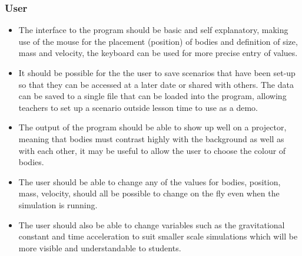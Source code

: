 \subsubsection{User}
\begin{itemize}
\item The interface to the program should be basic and self explanatory, making use of the mouse for the placement (position) of bodies and definition of size, mass and velocity, the keyboard can be used for more precise entry of values.
\item It should be possible for the the user to save scenarios that have been set-up so that they can be accessed at a later date or shared with others. The data can be saved to a single file that can be loaded into the program, allowing teachers to set up a scenario outside lesson time to use as a demo.
\item The output of the program should be able to show up well on a projector, meaning that bodies must contrast highly with the background as well as with each other, it may be useful to allow the user to choose the colour of bodies.
\item The user should be able to change any of the values for bodies, position, mass, velocity, should all be possible to change on the fly even when the simulation is running.
\item The user should also be able to change variables such as the gravitational constant and time acceleration to suit smaller scale simulations which will be more visible and understandable to students.
\end{itemize}